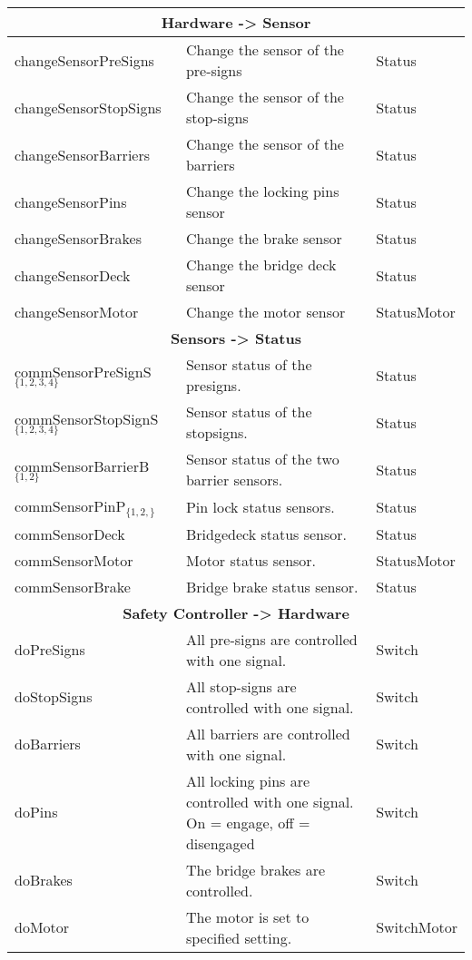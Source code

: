 \begin{center}
\begin{longtable}{|l|p{8cm}|l|}
		\hline
		\multicolumn{3}{c}{\textbf{Hardware ->  Sensor}} \\ \hline                              
		changeSensorPreSigns & Change the sensor of the pre-signs & Status \\                   
		changeSensorStopSigns & Change the sensor of the stop-signs & Status \\                 
		changeSensorBarriers & Change the sensor of the barriers & Status \\                    
		changeSensorPins & Change the locking pins sensor & Status \\                           
		changeSensorBrakes & Change the brake sensor & Status \\                                
		changeSensorDeck & Change the bridge deck sensor & Status \\                            
		changeSensorMotor & Change the motor sensor & StatusMotor \\                            
		                                                                                        
		\hline
		\multicolumn{3}{c}{\textbf{Sensors -> Status}} \\ \hline 
		commSensorPreSignS$_{\{1,2,3,4\}}$ & Sensor status of the presigns. & Status \\
		commSensorStopSignS$_{\{1,2,3,4\}}$ & Sensor status of the stopsigns. & Status \\
		commSensorBarrierB$_{\{1,2\}}$ & Sensor status of the two barrier sensors. & Status \\
		commSensorPinP$_{\{1,2,\}}$ & Pin lock status sensors. & Status \\
		commSensorDeck & Bridgedeck status sensor. & Status \\
		commSensorMotor & Motor status sensor. & StatusMotor \\
		commSensorBrake & Bridge brake status sensor. & Status \\  

		\hline
		\multicolumn{3}{c}{\textbf{Safety Controller -> Hardware}} \\ \hline
		doPreSigns & All pre-signs are controlled with one signal. & Switch \\
		doStopSigns & All stop-signs are controlled with one signal. & Switch \\
		doBarriers & All barriers are controlled with one signal. & Switch \\
		doPins & All locking pins are controlled with one signal. On = engage, off = disengaged & Switch \\
		doBrakes & The bridge brakes are controlled. & Switch \\ 
		doMotor & The motor is set to specified setting. & SwitchMotor \\
		

\end{longtable}
\end{center}
